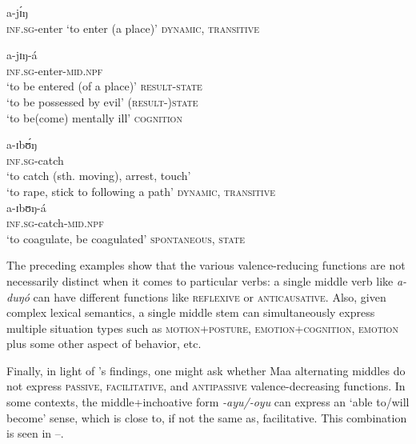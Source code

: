 \documentclass[output=paper,colorlinks,citecolor=brown
]{langscibook}
\begin{document}
\ea\label{ex:Payne:jing}
\begin{xlist}
\ex a-jɪ́ŋ\\
\textsc{inf.sg}-enter
\glt `to enter (a place)' \hfill \textsc{dynamic, transitive}

\ex\label{ex:Payne:mentally-ill}
\gll a-jɪŋ-á\\
\textsc{inf.sg}-enter-\textsc{mid.npf}\\
\glt `to be entered (of a place)' \hfill \textsc{result-state}\\
`to be possessed by evil' \hfill \textsc{(result-)state}\\
`to be(come) mentally ill' \hfill \textsc{cognition}\\
\end{xlist}
\z 

\ea \label{ex:Payne:unpredictable}
\begin{xlist}
\ex 
\gll a-ɪbʊ́ŋ \\
\textsc{inf.sg}-catch\\
\glt ‘to catch (sth. moving), arrest, touch'\\
`to rape, stick to following a path’ \hfill \textsc{dynamic, transitive}\\

\ex 
\gll a-ɪbʊŋ-á    \\
\textsc{inf.sg}-catch-\textsc{mid.npf}\\
\glt ‘to coagulate, be coagulated’ \hfill \textsc{spontaneous, state}

\end{xlist}
\z 

The preceding examples show that the various valence-reducing functions are not necessarily distinct when it comes to particular verbs: a single middle verb like \textit{a-duŋó} can have different functions like \textsc{reflexive} or \textsc{anticausative}. Also, given complex lexical semantics, a single middle stem can simultaneously express multiple situation types such as \textsc{motion}+\textsc{posture}, \textsc{emotion}+\textsc{cognition}, \textsc{emotion} plus some other aspect of behavior, etc.

Finally, in light of \citet{Inglese2022a}'s findings, one might ask whether Maa alternating middles do not express \textsc{passive}, \textsc{facilitative}, and \textsc{antipassive} valence-decreasing functions. In some contexts, the middle+inchoative form \textit{-ayu/-oyu} can express an `able to/will become' sense, which is close to, if not the same as, facilitative. This combination is seen in --.
\end{document}
